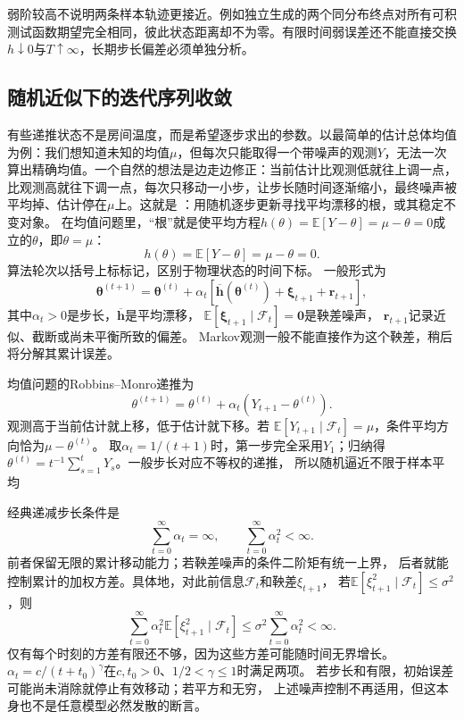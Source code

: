 弱阶较高不说明两条样本轨迹更接近。例如独立生成的两个同分布终点对所有可积
测试函数期望完全相同，彼此状态距离却不为零。有限时间弱误差还不能直接交换
$h\downarrow0$与$T\uparrow\infty$，长期步长偏差必须单独分析。

\subsection{随机近似下的迭代序列收敛}
\label{sec:stoch-approximation-markov-noise}

有些递推状态不是房间温度，而是希望逐步求出的参数。以最简单的估计总体均值为例：我们想知道未知的均值$\mu$，但每次只能取得一个带噪声的观测\(Y\)，无法一次算出精确均值。一个自然的想法是边走边修正：当前估计比观测低就往上调一点，比观测高就往下调一点，每次只移动一小步，让步长随时间逐渐缩小，最终噪声被平均掉、估计停在$\mu$上。这就是
：用随机逐步更新寻找平均漂移的根，或其稳定不变对象。
在均值问题里，“根”就是使平均方程\(h(\theta)=\mathbb E[Y-\theta]=\mu-\theta=0\)成立的\(\theta\)，即\(\theta=\mu\)：
\begin{equation}
  h(\theta)=\mathbb E[Y-\theta]=\mu-\theta=0.
  \label{eq:stoch-mean-root}
\end{equation}
算法轮次以括号上标标记，区别于物理状态的时间下标。
一般形式为
\begin{equation}
  \bm\theta^{(t+1)}=\bm\theta^{(t)}+\alpha_t
   [\overline{\bm h}(\bm\theta^{(t)})+\bm\xi_{t+1}+\bm r_{t+1}],
  \label{eq:stoch-general-stochastic-approximation}
\end{equation}
其中$\alpha_t>0$是步长，$\overline{\bm h}$是平均漂移，
$\mathbb E[\bm\xi_{t+1}\mid\mathcal F_t]=\bm0$是鞅差噪声，
$\bm r_{t+1}$记录近似、截断或尚未平衡所致的偏差。
Markov观测一般不能直接作为这个鞅差，稍后将分解其累计误差。

均值问题的Robbins--Monro递推为
\begin{equation}
  \theta^{(t+1)}=\theta^{(t)}
       +\alpha_t(Y_{t+1}-\theta^{(t)}).
  \label{eq:stoch-robbins-monro-mean}
\end{equation}
观测高于当前估计就上移，低于估计就下移。若
$\mathbb E[Y_{t+1}\mid\mathcal F_t]=\mu$，条件平均方向恰为$\mu-\theta^{(t)}$。
取$\alpha_t=1/(t+1)$时，第一步完全采用$Y_1$；归纳得
$\theta^{(t)}=t^{-1}\sum_{s=1}^tY_s$。一般步长对应不等权的递推，
所以随机逼近不限于样本平均

经典递减步长条件是
\begin{equation}
  \sum_{t=0}^\infty\alpha_t=\infty,\qquad
  \sum_{t=0}^\infty\alpha_t^2<\infty.
  \label{eq:stoch-robbins-monro-stepsizes}
\end{equation}
前者保留无限的累计移动能力；若鞅差噪声的条件二阶矩有统一上界，
后者就能控制累计的加权方差。具体地，对此前信息$\mathcal F_t$和鞅差$\xi_{t+1}$，
若$\mathbb E[\xi_{t+1}^2\mid\mathcal F_t]\leq\sigma^2$，则
\[
 \sum_{t=0}^\infty\alpha_t^2
 \mathbb E[\xi_{t+1}^2\mid\mathcal F_t]
 \leq\sigma^2\sum_{t=0}^\infty\alpha_t^2<\infty.
\]
仅有每个时刻的方差有限还不够，因为这些方差可能随时间无界增长。
$\alpha_t=c/(t+t_0)^\gamma$在$c,t_0>0$、$1/2<\gamma\leq1$时满足两项。
若步长和有限，初始误差可能尚未消除就停止有效移动；若平方和无穷，
上述噪声控制不再适用，但这本身也不是任意模型必然发散的断言。

